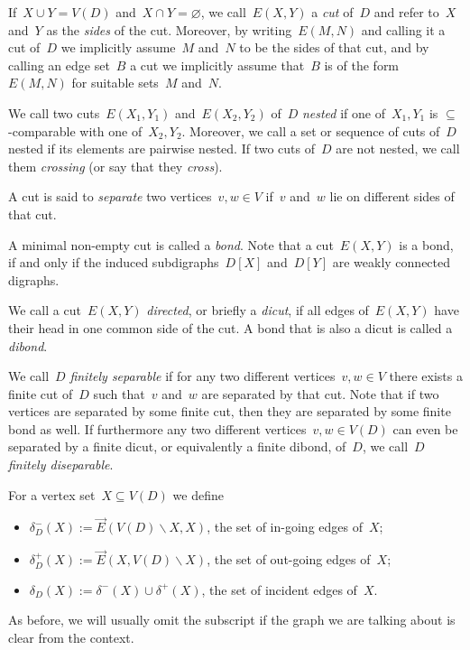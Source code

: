 \documentclass[reqno, 12pt]{amsart}
\numberwithin{equation}{section}
\numberwithin{figure}{section}
\let\emptyset=\varnothing
\let\setminus=\smallsetminus
\theoremstyle{plain}
\theoremstyle{definition}
\begin{document}
If~${X \cup Y = V(D)}$ and~${X \cap Y = \emptyset}$, we call~${E(X, Y)}$ a \emph{cut} of~$D$ and refer to~$X$ and~$Y$ as the \emph{sides} of the cut. 
Moreover, by writing~${E(M, N)}$ and calling it a cut of~$D$ we implicitly assume~$M$ and~$N$ to be the sides of that cut, 
and by calling an edge set~$B$ a cut we implicitly assume that~$B$ is of the form~${E(M,N)}$ for suitable sets~$M$ and~$N$. 

We call two cuts~${E(X_1, Y_1)}$ and~${E(X_2, Y_2)}$ of~$D$ \emph{nested} 
if one of~${X_1, Y_1}$ is $\subseteq$-comparable with one of~${X_2, Y_2}$.
Moreover, we call a set or sequence of cuts of~$D$ nested if its elements are pairwise nested. 
If two cuts of~$D$ are not nested, we call them \emph{crossing} (or say that they \emph{cross}). 

A cut is said to \emph{separate} two vertices~${v, w \in V}$ if~$v$ and~$w$ lie on different sides of that cut. 

A minimal non-empty cut is called a \emph{bond}. 
Note that a cut~${E(X, Y)}$ is a bond, if and only if the induced subdigraphs~${D[X]}$ and~${D[Y]}$ are weakly connected digraphs. 

We call a cut~${E(X, Y)}$ \emph{directed}, or briefly a \emph{dicut}, if all edges of~${E(X, Y)}$ have their head in one common side of the cut. 
A bond that is also a dicut is called a \emph{dibond}.

We call~$D$ \emph{finitely separable} if for any two different vertices~${v, w \in V}$ there exists a finite cut of~$D$ such that~$v$ and~$w$ are separated by that cut. 
Note that if two vertices are separated by some finite cut, then they are separated by some finite bond as well. 
If furthermore any two different vertices~${v, w \in V(D)}$ can even be separated by a finite dicut, or equivalently a finite dibond, of~$D$, we call~$D$ \emph{finitely diseparable}.

For a vertex set~${X \subseteq V(D)}$ we define 
\begin{itemize}
    \item ${\delta_D^-(X) := \overrightarrow{E}(V(D) \setminus X, X)}$, the set of in-going edges of~$X$;
    \item ${\delta_D^+(X) := \overrightarrow{E}(X, V(D) \setminus X)}$, the set of out-going edges of~$X$;
    \item ${\delta_D(X) := \delta^-(X) \cup \delta^+(X)}$, the set of incident edges of~$X$.
\end{itemize}
As before, we will usually omit the subscript if the graph we are talking about is clear from the context. 
\end{document}
